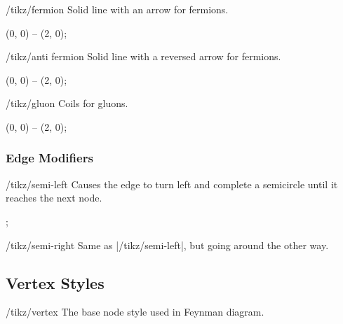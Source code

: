 \documentclass[a4paper,final]{ltxdoc}
\begin{document}
\begin{key}{/tikz/fermion}
  Solid line with an arrow for fermions.

\begin{codeexample}[]
\tikz \draw[fermion] (0, 0) -- (2, 0);
\end{codeexample}
\end{key}

\begin{key}{/tikz/anti fermion}
  Solid line with a reversed arrow for fermions.

\begin{codeexample}[]
\tikz {} (0, 0) -- (2, 0);
\end{codeexample}
\end{key}

\begin{key}{/tikz/gluon}
  Coils for gluons.

\begin{codeexample}[]
\tikz \draw[gluon] (0, 0) -- (2, 0);
\end{codeexample}
\end{key}


\subsubsection{Edge Modifiers}
\label{subsubsec:edge_modifiers}

\begin{key}{/tikz/semi-left}
  Causes the edge to turn left and complete a semicircle until it reaches the
  next node.

\begin{codeexample}[]
\tikz {};
\end{codeexample}
\end{key}

\begin{key}{/tikz/semi-right}
  Same as |/tikz/semi-left|, but going around the other way.
\end{key}


\subsection{Vertex Styles}
\label{subsec:vertex_styles}

\begin{key}{/tikz/vertex}
  The base node style used in Feynman diagram.
\end{key}
\end{document}

